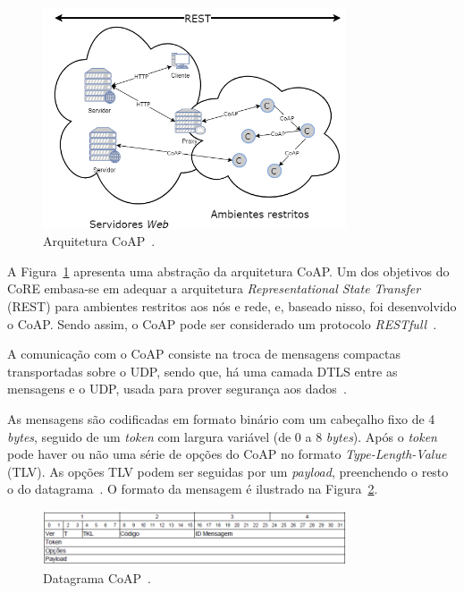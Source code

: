 \begin{figure}[ht]
\centering
\includegraphics[width=0.8\textwidth]{imagens/coap_arq.png}
\caption{Arquitetura CoAP~\cite{shelby2014constrained}.
\label{fig:coap_arq}}
\end{figure}
\FloatBarrier
 
 A Figura~\ref{fig:coap_arq} apresenta uma abstração da arquitetura CoAP. Um dos objetivos do CoRE embasa-se em adequar a arquitetura \textit{Representational State Transfer} (REST) para ambientes restritos aos nós e rede, e, baseado nisso, foi desenvolvido o CoAP. Sendo assim, o CoAP pode ser considerado um protocolo \textit{RESTfull}~\cite{shelby2014constrained}.
 
 A comunicação com o CoAP consiste na troca de mensagens compactas transportadas sobre o UDP, sendo que, há uma camada DTLS entre as mensagens e o UDP, usada para prover segurança aos dados~\cite{shelby2014constrained}. 
 
 As mensagens são codificadas em formato binário com um cabeçalho fixo de 4 \textit{bytes}, seguido de um \textit{token} com largura variável (de 0 a 8 \textit{bytes}). Após o \textit{token} pode haver ou não uma série de opções do CoAP no formato \textit{Type-Length-Value} (TLV). As opções TLV podem ser seguidas por um \textit{payload}, preenchendo o resto o do datagrama~\cite{shelby2014constrained}. O formato da mensagem é ilustrado na Figura~\ref{fig:coap_header}.
 
 \begin{figure}[ht]
\centering
\includegraphics[width=0.8\textwidth]{imagens/coap_header.png}
\caption{Datagrama CoAP~\cite{shelby2014constrained}.
\label{fig:coap_header}}
\end{figure}
\FloatBarrier


